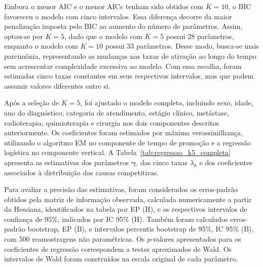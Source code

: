 \documentclass[11pt,a4paper]{article}
\begin{document}
Embora o menor AIC e o menor AICc tenham sido obtidos com $K=10$, o BIC favoreceu o modelo com cinco intervalos. Essa diferença decorre da maior penalização imposta pelo BIC ao aumento do número de parâmetros. Assim, optou-se por $K=5$, dado que o modelo com $K=5$ possui 28 parâmetros, enquanto o modelo com $K=10$ possui 33 parâmetros. Desse modo, busca-se mais parcimônia, representando as mudanças nas taxas de ativação ao longo do tempo sem acrescentar complexidade excessiva ao modelo. Com essa escolha, foram estimadas cinco taxas constantes em seus respectivos intervalos, mas que podem assumir valores diferentes entre si. 

Após a seleção de $K=5$, foi ajustado o modelo completo, incluindo sexo, idade, ano do diagnóstico, categoria de atendimento, estágio clínico, metástase, radioterapia, quimioterapia e cirurgia nos dois componentes descritos anteriormente. Os coeficientes foram estimados por máxima verossimilhança, utilizando o algoritmo EM no componente de tempo de promoção e a regressão logística no componente vertical. A Tabela~\ref{tab:regressao_k5_completa} apresenta as estimativas dos parâmetros $\bm\gamma$, das cinco taxas $\lambda_k$ e dos coeficientes associados à distribuição das causas competitivas.

Para avaliar a precisão das estimativas, foram considerados os erros-padrão obtidos pela matriz de informação observada, calculada numericamente a partir da Hessiana, identificados na tabela por EP (H), e os respectivos intervalos de confiança de 95\%, indicados por IC 95\% (H). Também foram calculados erros-padrão bootstrap, EP (B), e intervalos percentis bootstrap de 95\%, IC 95\% (B), com 500 reamostragens não paramétricas. Os $p$-valores apresentados para os coeficientes de regressão correspondem a testes aproximados de Wald. Os intervalos de Wald foram construídos na escala original de cada parâmetro. 
\end{document}
